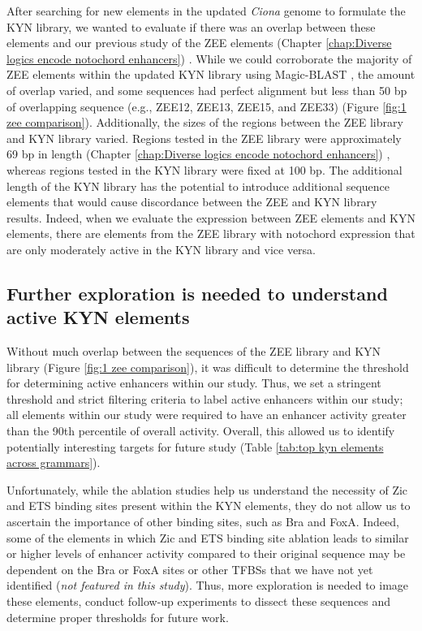 After searching for new elements in the updated \textit{Ciona} genome to formulate the KYN library, we wanted to evaluate if there was an overlap between these elements and our previous study of the ZEE elements (Chapter \ref{chap:Diverse logics encode notochord enhancers}) \cite{song2022}. While we could corroborate the majority of ZEE elements within the updated KYN library using Magic-BLAST \cite{boratyn2019}, the amount of overlap varied, and some sequences had perfect alignment but less than 50 bp of overlapping sequence (e.g., ZEE12, ZEE13, ZEE15, and ZEE33) (Figure \ref{fig:1 zee comparison}). Additionally, the sizes of the regions between the ZEE library and KYN library varied. Regions tested in the ZEE library were approximately 69 bp in length (Chapter \ref{chap:Diverse logics encode notochord enhancers}) \cite{song2022}, whereas regions tested in the KYN library were fixed at 100 bp. The additional length of the KYN library has the potential to introduce additional sequence elements that would cause discordance between the ZEE and KYN library results. Indeed, when we evaluate the expression between ZEE elements and KYN elements, there are elements from the ZEE library with notochord expression that are only moderately active in the KYN library and vice versa. 

\subsection{Further exploration is needed to understand active KYN elements}

Without much overlap between the sequences of the ZEE library and KYN library (Figure \ref{fig:1 zee comparison}), it was difficult to determine the threshold for determining active enhancers within our study. Thus, we set a stringent threshold and strict filtering criteria to label active enhancers within our study; all elements within our study were required to have an enhancer activity greater than the 90th percentile of overall activity. Overall, this allowed us to identify potentially interesting targets for future study (Table \ref{tab:top kyn elements across grammars}). 

Unfortunately, while the ablation studies help us understand the necessity of Zic and ETS binding sites present within the KYN elements, they do not allow us to ascertain the importance of other binding sites, such as Bra and FoxA. Indeed, some of the elements in which Zic and ETS binding site ablation leads to similar or higher levels of enhancer activity compared to their original sequence may be dependent on the Bra or FoxA sites or other TFBSs that we have not yet identified (\textit{not featured in this study}). Thus, more exploration is needed to image these elements, conduct follow-up experiments to dissect these sequences and determine proper thresholds for future work.

